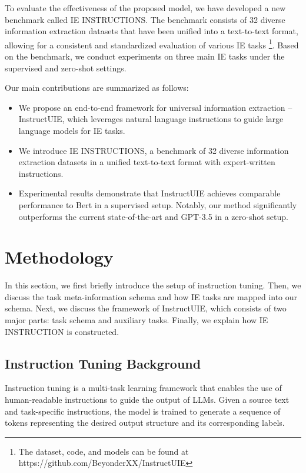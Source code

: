 \documentclass[11pt]{article}
\begin{document}
To evaluate the effectiveness of the proposed model, we have developed a new benchmark called IE INSTRUCTIONS. The benchmark consists of 32 diverse information extraction datasets that have been unified into a text-to-text format, allowing for a consistent and standardized evaluation of various IE tasks \footnote{The dataset, code, and models can be found at 
https://github.com/BeyonderXX/InstructUIE}. 
Based on the benchmark, we conduct experiments on three main IE tasks under the supervised and zero-shot settings. 



Our main contributions are summarized as follows:

\begin{itemize}[leftmargin=*, align=left]
    \item We propose an end-to-end framework for universal information extraction – InstructUIE, which leverages natural language instructions to guide large language models for IE tasks.
    \item We introduce IE INSTRUCTIONS, a benchmark of 32 diverse information extraction datasets in a unified text-to-text format with expert-written instructions. 
    \item Experimental results demonstrate that InstructUIE achieves comparable performance to Bert in a supervised setup. Notably, our method significantly outperforms the current state-of-the-art and GPT-3.5 in a zero-shot setup.
\end{itemize}




\section{Methodology}
In this section, we first briefly introduce the setup of instruction tuning. 
Then, we discuss the task meta-information schema and how IE tasks are mapped into our schema. 
Next, we discuss the framework of InstructUIE, which consists of two major parts: task schema and auxiliary tasks.
Finally, we explain how IE INSTRUCTION is constructed.


\subsection{Instruction Tuning Background}
Instruction tuning is a multi-task learning framework that enables the use of human-readable instructions to guide the output of LLMs. Given a source text and task-specific instructions, the model is trained to generate a sequence of tokens representing the desired output structure and its corresponding labels. 
\end{document}
